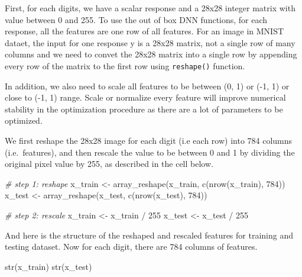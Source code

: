 \documentclass[
  12pt,
]{krantz}
\makeatletter
\newenvironment{Shaded}{\begin{snugshade}}{\end{snugshade}}
\newcommand{\CommentTok}[1]{\textcolor[rgb]{0.37,0.37,0.37}{\textit{#1}}}
\newcommand{\DecValTok}[1]{\textcolor[rgb]{0.06,0.06,0.06}{#1}}
\newcommand{\FunctionTok}[1]{\textcolor[rgb]{0,0,0}{#1}}
\newcommand{\NormalTok}[1]{#1}
\newcommand{\OtherTok}[1]{\textcolor[rgb]{0.37,0.37,0.37}{#1}}
\newcommand{\SpecialCharTok}[1]{\textcolor[rgb]{0,0,0}{#1}}
\newenvironment{kframe}{%
\medskip{}
\setlength{\fboxsep}{.8em}
 \def\at@end@of@kframe{}%
 \ifinner\ifhmode%
  \def\at@end@of@kframe{\end{minipage}}%
  \begin{minipage}{\columnwidth}%
 \fi\fi%
 \def\FrameCommand##1{\hskip\@totalleftmargin \hskip-\fboxsep
 \colorbox{shadecolor}{##1}\hskip-\fboxsep
     \hskip-\linewidth \hskip-\@totalleftmargin \hskip\columnwidth}%
 \MakeFramed {\advance\hsize-\width
   \@totalleftmargin\z@ \linewidth\hsize
   \@setminipage}}%
 {\par\unskip\endMakeFramed%
 \at@end@of@kframe}
\renewenvironment{Shaded}{\begin{kframe}}{\end{kframe}}
\makeatother
\begin{document}
First, for each digits, we have a scalar response and a 28x28 integer matrix with value between 0 and 255. To use the out of box DNN functions, for each response, all the features are one row of all features. For an image in MNIST dataet, the input for one response y is a 28x28 matrix, not a single row of many columns and we need to convet the 28x28 matrix into a single row by appending every row of the matrix to the first row using \texttt{reshape()} function.

In addition, we also need to scale all features to be between (0, 1) or (-1, 1) or close to (-1, 1) range. Scale or normalize every feature will improve numerical stability in the optimization procedure as there are a lot of parameters to be optimized.

We first reshape the 28x28 image for each digit (i.e each row) into 784 columns (i.e.~features), and then rescale the value to be between 0 and 1 by dividing the original pixel value by 255, as described in the cell below.

\begin{Shaded}
\begin{Highlighting}[]
\CommentTok{\# step 1: reshape}
\NormalTok{x\_train }\OtherTok{\textless{}{-}} \FunctionTok{array\_reshape}\NormalTok{(x\_train, }
                         \FunctionTok{c}\NormalTok{(}\FunctionTok{nrow}\NormalTok{(x\_train), }\DecValTok{784}\NormalTok{))}
\NormalTok{x\_test }\OtherTok{\textless{}{-}} \FunctionTok{array\_reshape}\NormalTok{(x\_test, }
                        \FunctionTok{c}\NormalTok{(}\FunctionTok{nrow}\NormalTok{(x\_test), }\DecValTok{784}\NormalTok{))}

\CommentTok{\# step 2: rescale}
\NormalTok{x\_train }\OtherTok{\textless{}{-}}\NormalTok{ x\_train }\SpecialCharTok{/} \DecValTok{255}
\NormalTok{x\_test }\OtherTok{\textless{}{-}}\NormalTok{ x\_test }\SpecialCharTok{/} \DecValTok{255}
\end{Highlighting}
\end{Shaded}

And here is the structure of the reshaped and rescaled features for training and testing dataset. Now for each digit, there are 784 columns of features.

\begin{Shaded}
\begin{Highlighting}[]
\FunctionTok{str}\NormalTok{(x\_train)}
\FunctionTok{str}\NormalTok{(x\_test)}
\end{Highlighting}
\end{Shaded}
\end{document}
